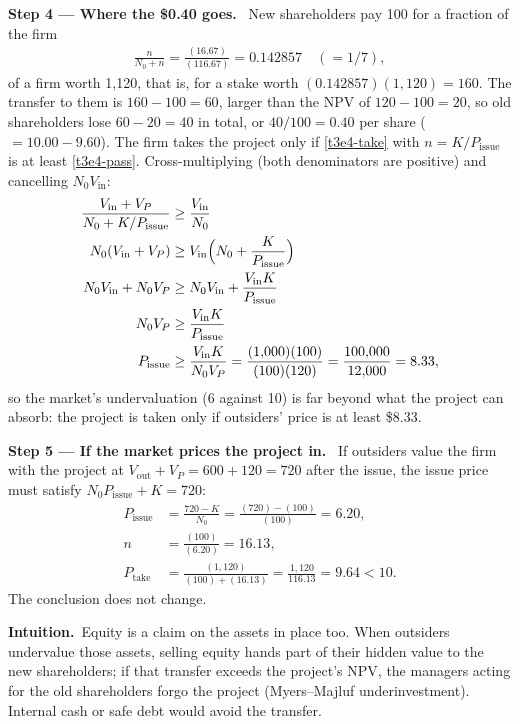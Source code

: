 \documentclass[11pt,a4paper]{article}
\newcommand{\step}[2]{\par\medskip\noindent\textbf{Step #1 --- #2.}~}
\newcommand{\intuition}{\par\medskip\noindent\textbf{Intuition.}~}
\begin{document}
\step{4}{Where the \$0.40 goes} New shareholders pay 100 for a fraction of the firm
\begin{align}
  \frac{n}{N_0+n} = \frac{(16.67)}{(116.67)} = 0.142857 \quad(=1/7), \nonumber
\end{align}
of a firm worth 1{,}120, that is, for a stake worth $(0.142857)(1{,}120)=160$. The transfer to them is $160-100=60$, larger than the NPV of $120-100=20$, so old shareholders lose $60-20=40$ in total, or $40/100=0.40$ per share ($=10.00-9.60$). The firm takes the project only if \eqref{t3e4-take} with $n=K/P_{\text{issue}}$ is at least \eqref{t3e4-pass}. Cross-multiplying (both denominators are positive) and cancelling $N_0V_{\text{in}}$:
\begin{align}
  \frac{V_{\text{in}}+V_P}{N_0+K/P_{\text{issue}}} &\ge \frac{V_{\text{in}}}{N_0} \nonumber\\
  N_0(V_{\text{in}}+V_P) &\ge V_{\text{in}}\Bigl(N_0+\frac{K}{P_{\text{issue}}}\Bigr) \nonumber\\
  N_0V_{\text{in}}+N_0 V_P &\ge N_0V_{\text{in}}+\frac{V_{\text{in}}K}{P_{\text{issue}}} \nonumber\\
  N_0 V_P &\ge \frac{V_{\text{in}}K}{P_{\text{issue}}} \nonumber\\
  P_{\text{issue}} &\ge \frac{V_{\text{in}}K}{N_0 V_P}= \frac{(1{,}000)(100)}{(100)(120)} = \frac{100{,}000}{12{,}000} = 8.33, \label{t3e4-thr}
\end{align}
so the market's undervaluation (6 against 10) is far beyond what the project can absorb: the project is taken only if outsiders' price is at least \$8.33.

\step{5}{If the market prices the project in} If outsiders value the firm with the project at $V_{\text{out}}+V_P=600+120=720$ after the issue, the issue price must satisfy $N_0P_{\text{issue}}+K=720$:
\begin{align}
  P_{\text{issue}} &= \frac{720-K}{N_0} = \frac{(720)-(100)}{(100)} = 6.20, \nonumber\\
  n &= \frac{(100)}{(6.20)} = 16.13, \nonumber\\
  P_{\text{take}} &= \frac{(1{,}120)}{(100)+(16.13)} = \frac{1{,}120}{116.13} = 9.64 < 10. \nonumber
\end{align}
The conclusion does not change.

\intuition Equity is a claim on the assets in place too. When outsiders undervalue those assets, selling equity hands part of their hidden value to the new shareholders; if that transfer exceeds the project's NPV, the managers acting for the old shareholders forgo the project (Myers--Majluf underinvestment). Internal cash or safe debt would avoid the transfer.
\end{document}
